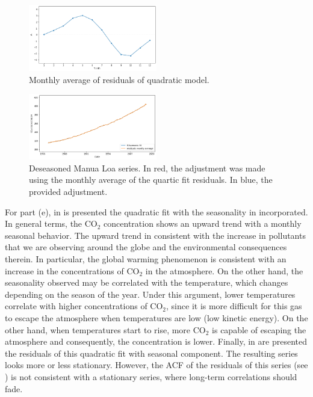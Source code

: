 \documentclass[11pt, english]{article}
\begin{document}
\begin{multicols}{2}
\begin{figure}[t]
	\centering
	\caption{Monthly average of residuals of quadratic model.}
	\label{fig:co2-montly-res-average}
	\includegraphics[width=0.5\textwidth]{co2-montly-res-average}
\end{figure}

\begin{figure}[b]
	\centering
	\caption{Deseasoned Manua Loa series. In red, the adjustment was made using the monthly average of the quartic fit residuals. In blue, the provided adjustment.}
	\label{fig:co2-season-adj}
	\includegraphics[width=0.5\textwidth]{co2-season-adj}
\end{figure}

For part (e), in  is presented the quadratic fit with the seasonality in  incorporated. In general terms, the CO$_{2}$ concentration shows an upward trend with a monthly seasonal behavior. The upward trend in consistent with the increase in pollutants that we are observing around the globe and the environmental consequences therein. In particular, the global warming phenomenon is consistent with an increase in the concentrations of CO$_{2}$ in the atmosphere. On the other hand, the seasonality observed may be correlated with the temperature, which changes depending on the season of the year. Under this argument, lower temperatures correlate with higher concentrations of CO$_{2}$, since it is more difficult for this gas to escape the atmosphere when temperatures are low (low kinetic energy). On the other hand, when temperatures start to rise, more CO$_{2}$ is capable of escaping the atmosphere and consequently, the concentration is lower. Finally, in  are presented the residuals of this quadratic fit with seasonal component. The resulting series looks more or less stationary. However, the ACF of the residuals of this series (see ) is not consistent with a stationary series, where long-term correlations should fade.


\end{multicols}
\end{document}

